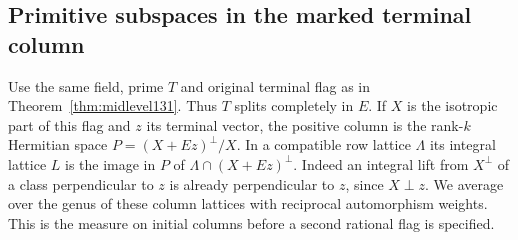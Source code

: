 \documentclass[a4paper,11pt]{article}
\theoremstyle{definition}
\theoremstyle{remark}
\numberwithin{equation}{section}
\begin{document}
\subsection{Primitive subspaces in the marked terminal column}\label{nav:IX-12}
\label{sec:termmean221}

Use the same field, prime \(T\) and original terminal flag as
in Theorem~\ref{thm:midlevel131}. Thus \(T\) splits completely
in \(E\). If \(X\) is the isotropic part of this flag and \(z\)
its terminal vector, the positive column is the rank-\(k\)
Hermitian space \(P=(X+Ez)^\perp/X\). In a compatible
row lattice \(\Lambda\) its integral lattice \(L\) is the
image in \(P\) of \(\Lambda\cap(X+Ez)^\perp\). Indeed an
integral lift from \(X^\perp\) of a class perpendicular to
\(z\) is already perpendicular to \(z\), since \(X\perp z\).
We average over the genus of these column lattices with
reciprocal automorphism weights. This is the measure on
initial columns before a second rational flag is specified.
\end{document}
